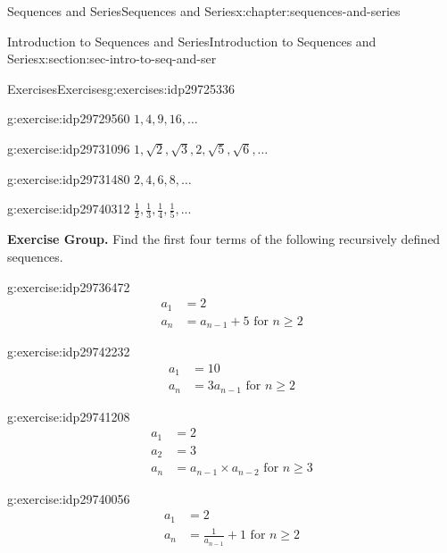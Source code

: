 \documentclass[twoside,10pt,]{book}
\numberwithin{equation}{section}
\newcommand{\amp}{&}
\begin{document}
\begin{chapterptx}{Sequences and Series}{}{Sequences and Series}{}{}{x:chapter:sequences-and-series}
\begin{sectionptx}{Introduction to Sequences and Series}{}{Introduction to Sequences and Series}{}{}{x:section:sec-intro-to-seq-and-ser}
\begin{exercises-subsection}{Exercises}{}{Exercises}{}{}{g:exercises:idp29725336}
\begin{exercisegroup}
\begin{divisionexerciseeg}{9}{}{}{g:exercise:idp29729560}
\(1, 4, 9, 16, \ldots\)\end{divisionexerciseeg}%
\begin{divisionexerciseeg}{10}{}{}{g:exercise:idp29731096}%
\(1,\sqrt 2 ,\sqrt 3 ,2,\sqrt 5 ,\sqrt 6 ,\ldots\)\end{divisionexerciseeg}%
\begin{divisionexerciseeg}{11}{}{}{g:exercise:idp29731480}%
\(2, 4, 6, 8, \ldots\)\end{divisionexerciseeg}%
\begin{divisionexerciseeg}{12}{}{}{g:exercise:idp29740312}%
\(\frac{1}{2},\frac{1}{3},\frac{1}{4},\frac{1}{5},...\)\end{divisionexerciseeg}%
\end{exercisegroup}
\par\medskip\noindent
\par\medskip\noindent%
\textbf{Exercise Group.}\space\space%
Find the first four terms of the following recursively defined sequences.\begin{exercisegroup}
\begin{divisionexerciseeg}{13}{}{}{g:exercise:idp29736472}%
%
\begin{align*}
a_1 \amp = 2\\
a_n \amp = a_{n - 1} + 5 \text{   for } n \ge 2
\end{align*}
\end{divisionexerciseeg}%
\begin{divisionexerciseeg}{14}{}{}{g:exercise:idp29742232}%
%
\begin{align*}
a_1 \amp = 10\\
a_n \amp = 3 a_{n - 1} \text{   for } n \ge 2
\end{align*}
\end{divisionexerciseeg}%
\begin{divisionexerciseeg}{15}{}{}{g:exercise:idp29741208}%
%
\begin{align*}
a_1 \amp = 2\\
a_2 \amp = 3\\
a_n \amp = a_{n - 1} \times a_{n - 2} \text{   for } n \ge 3
\end{align*}
\end{divisionexerciseeg}%
\begin{divisionexerciseeg}{16}{}{}{g:exercise:idp29740056}%
%
\begin{align*}
a_1 \amp = 2\\
a_n \amp =\frac{1}{a_{n - 1}} + 1 \text{   for } n \ge 2
\end{align*}
\end{divisionexerciseeg}%

\end{exercisegroup}
\end{exercises-subsection}
\end{sectionptx}
\end{chapterptx}
\end{document}
